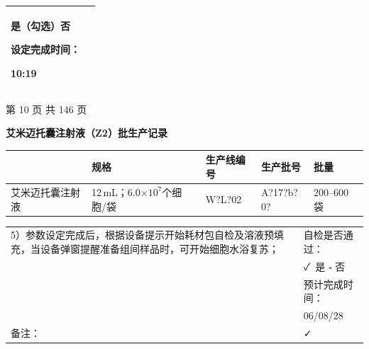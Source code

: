 \documentclass[UTF8,10pt,a4paper,fontset=fandol]{ctexart}
\newcommand{\fieldvalue}[1]{#1}
\newcommand{\handwritten}[1]{#1}
\begin{document}
\begin{tabularx}{\textwidth}{|X|c|}
\begin{minipage}[t]{0.96\linewidth}
\fieldvalue{\handwritten{是（勾选）}}\quad 否

\vspace{10pt}
设定完成时间：

\fieldvalue{\handwritten{10:19}}
\vspace{2pt}
\end{minipage}
\\
\hline
\end{tabularx}

\vfill

\begin{center}
第 10 页 共 146 页
\end{center}

\newpage

\begin{center}
\textbf{艾米迈托囊注射液（Z2）批生产记录}
\end{center}

\begin{tabularx}{\textwidth}{|p{}|p{}|p{}|p{}|X|}
\hline
 & \textbf{规格} & \textbf{生产线编号} & \textbf{生产批号} & \textbf{批量} \\
\hline
艾米迈托囊注射液 &
12\,mL；6.0$\times 10^7$个细胞/袋 &
\fieldvalue{\handwritten{W?L?02}} &
\fieldvalue{\handwritten{A?17?b?0?}} &
200--600 袋 \\
\hline
\end{tabularx}

\vspace{0.2em}

\begin{tabularx}{\textwidth}{|X|p{}|}
\hline
5）参数设定完成后，根据设备提示开始耗材包自检及溶液预填充，当设备弹窗提醒准备组间样品时，可开始细胞水浴复苏； &
自检是否通过：\\
& 
\fieldvalue{\handwritten{✓}}\ 是 \quad $\square$ 否\\
& 预计完成时间：\\
&
\fieldvalue{\handwritten{06/08/28}}\\
\hline
备注：
&
\fieldvalue{\handwritten{✓}}\\
\hline
\end{tabularx}
\end{document}
